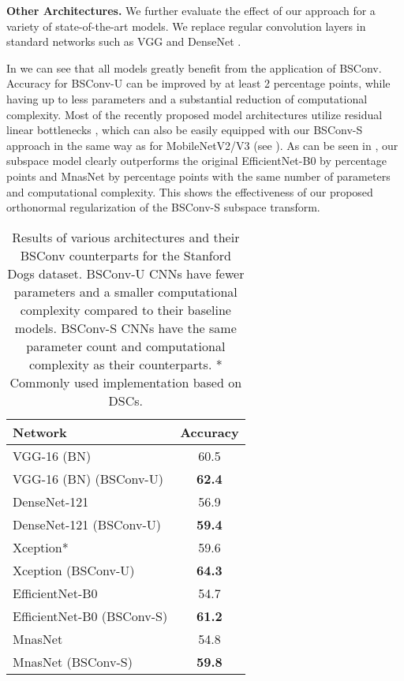 \documentclass[10pt,twocolumn,letterpaper]{article}
\newcommand{\DCCK}{BSConv\xspace}
\newcommand{\DCCKU}{\DCCK-U\xspace}
\newcommand{\DCCKS}{\DCCK-S\xspace}
\begin{document}
\textbf{Other Architectures.}
We further evaluate the effect of our approach for a variety of state-of-the-art models.
We replace regular convolution layers in standard networks such as VGG \cite{simonyan2014very} and DenseNet \cite{huang2017densely}.

In  we can see that all models greatly benefit from the application of \DCCK.
Accuracy for \DCCKU can be improved by at least 2 percentage points, while having up to  less parameters and a substantial reduction of computational complexity.
Most of the recently proposed model architectures utilize residual linear bottlenecks \cite{sandler2018mobilenetv2}, which can also be easily equipped with our \DCCKS approach in the same way as for MobileNetV2/V3 (see ).
As can be seen in , our subspace model clearly outperforms the original EfficientNet-B0 \cite{tan2019efficientnet} by  percentage points and MnasNet \cite{tan2019mnasnet} by  percentage points with the same number of parameters and computational complexity.
This shows the effectiveness of our proposed orthonormal regularization of the \DCCKS subspace transform.

\begin{table}
	\begin{center}
		\begin{tabular}{|l|c|}
			\hline
			Network & Accuracy \\
			\hline
			VGG-16 (BN) \cite{simonyan2014very}	& 60.5 \\
			VGG-16 (BN) (\DCCKU) 				& \bf{62.4} \\
			\hline
			DenseNet-121 \cite{huang2017densely}	& 56.9 \\
			DenseNet-121 (\DCCKU) 				& \bf{59.4} \\
			\hline
			Xception* \cite{chollet2017xception}	& 59.6 \\
			Xception (\DCCKU) 					& \bf{64.3} \\
			\hline
			EfficientNet-B0 \cite{tan2019efficientnet}	& 54.7 \\
			EfficientNet-B0 (\DCCKS)				& \bf{61.2} \\
			\hline
			MnasNet \cite{tan2019mnasnet}			& 54.8 \\
			MnasNet (\DCCKS)						& \bf{59.8} \\
			\hline
			\end{tabular}
		\end{center}
	\caption{Results of various architectures and their \DCCK counterparts for the Stanford Dogs dataset.
		\DCCKU CNNs have fewer parameters and a smaller computational complexity compared to their baseline models.
		\DCCKS CNNs have the same parameter count and computational complexity as their counterparts.
		* Commonly used implementation based on DSCs.
	}
	\label{tab:dogsOthers}
\end{table}
\end{document}
